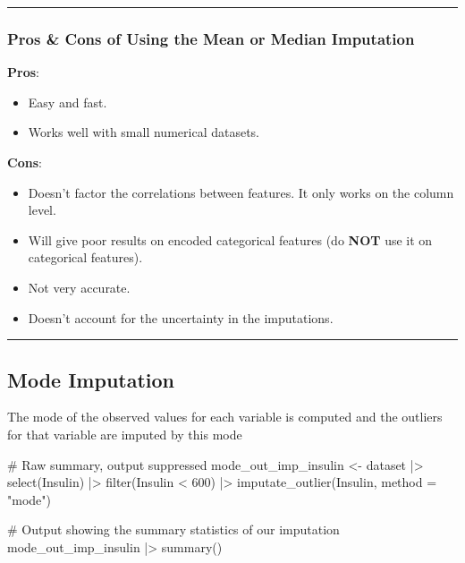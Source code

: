 \documentclass[
  letterpaper,
  DIV=11,
  numbers=noendperiod]{scrreprt}
\newenvironment{Shaded}{\begin{snugshade}}{\end{snugshade}}
\newcommand{\AttributeTok}[1]{\textcolor[rgb]{0.40,0.45,0.13}{#1}}
\newcommand{\CommentTok}[1]{\textcolor[rgb]{0.37,0.37,0.37}{#1}}
\newcommand{\DecValTok}[1]{\textcolor[rgb]{0.68,0.00,0.00}{#1}}
\newcommand{\FunctionTok}[1]{\textcolor[rgb]{0.28,0.35,0.67}{#1}}
\newcommand{\NormalTok}[1]{\textcolor[rgb]{0.00,0.23,0.31}{#1}}
\newcommand{\OtherTok}[1]{\textcolor[rgb]{0.00,0.23,0.31}{#1}}
\newcommand{\SpecialCharTok}[1]{\textcolor[rgb]{0.37,0.37,0.37}{#1}}
\newcommand{\StringTok}[1]{\textcolor[rgb]{0.13,0.47,0.30}{#1}}
\providecommand{\tightlist}{%
  \setlength{\itemsep}{0pt}\setlength{\parskip}{0pt}}\usepackage{longtable,booktabs,array}
\begin{document}
\begin{center}\rule{0.5\linewidth}{0.5pt}\end{center}

\hypertarget{pros-cons-of-using-the-mean-or-median-imputation}{%
\subsubsection{Pros \& Cons of Using the Mean or Median
Imputation}\label{pros-cons-of-using-the-mean-or-median-imputation}}

\textbf{Pros}:

\begin{itemize}
\tightlist
\item
  Easy and fast.
\item
  Works well with small numerical datasets.
\end{itemize}

\textbf{Cons}:

\begin{itemize}
\tightlist
\item
  Doesn't factor the correlations between features. It only works on the
  column level.
\item
  Will give poor results on encoded categorical features (do
  \textbf{NOT} use it on categorical features).
\item
  Not very accurate.
\item
  Doesn't account for the uncertainty in the imputations.
\end{itemize}

\begin{center}\rule{0.5\linewidth}{0.5pt}\end{center}

\hypertarget{mode-imputation}{%
\subsection{Mode Imputation}\label{mode-imputation}}

The mode of the observed values for each variable is computed and the
outliers for that variable are imputed by this mode

\begin{Shaded}
\begin{Highlighting}[]
\CommentTok{\# Raw summary, output suppressed}
\NormalTok{mode\_out\_imp\_insulin }\OtherTok{\textless{}{-}}\NormalTok{ dataset }\SpecialCharTok{|\textgreater{}}
  \FunctionTok{select}\NormalTok{(Insulin) }\SpecialCharTok{|\textgreater{}}
  \FunctionTok{filter}\NormalTok{(Insulin }\SpecialCharTok{\textless{}} \DecValTok{600}\NormalTok{) }\SpecialCharTok{|\textgreater{}}
  \FunctionTok{imputate\_outlier}\NormalTok{(Insulin, }\AttributeTok{method =} \StringTok{"mode"}\NormalTok{)}

\CommentTok{\# Output showing the summary statistics of our imputation}
\NormalTok{mode\_out\_imp\_insulin }\SpecialCharTok{|\textgreater{}}
  \FunctionTok{summary}\NormalTok{()}
\end{Highlighting}
\end{Shaded}
\end{document}
